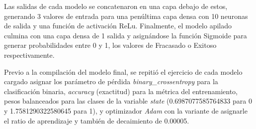 Las salidas de cada modelo se concatenaron en una capa debajo de estos, generando 3 valores de entrada para una penúltima capa densa con 10 neuronas de salida y una función de activación ReLu. Finalmente, el modelo apilado culmina con una capa densa de 1 salida y asignándose la función Sigmoide para generar probabilidades entre 0 y 1, los valores de Fracasado o Exitoso respectivamente.

Previo a la compilación del modelo final, se repitió el ejercicio de cada modelo cargado asignar los parámetro de pérdida \textit{binary\_crossentropy} para la clasificación binaria, \textit{accuracy} (exactitud) para la métrica del entrenamiento, pesos balanceados para las clases de la variable \textit{state} (0.6987077585764833 para 0 y 1.7581290322580645 para 1), y optimizador \textit{Adam} con la variante de asignarle el ratio de aprendizaje y también de decaimiento de 0.00005.